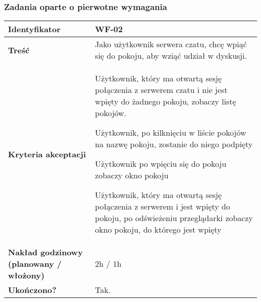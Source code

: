 \subsubsection{Zadania oparte o pierwotne wymagania}

\begin{tabular}{ | l | l | }
	\hline
		\textbf{Identyfikator} &
		WF-02
		\\

	\hline
		\textbf{Treść} & \parbox[t]{11.5cm}{\strut
			Jako użytkownik serwera czatu, chcę wpiąć się do pokoju,
			aby wziąć udział w dyskusji.
		\strut}\\

	\hline
		\parbox[t]{4cm}{\textbf{Kryteria akceptacji}} & \parbox[t]{11.5cm}{\strut
			\begin{enumreq}
				\item Użytkownik, który ma otwartą sesję
				połączenia z serwerem czatu i nie jest wpięty
				do żadnego pokoju, zobaczy listę pokojów.
				\item Użytkownik, po kilknięciu w liście pokojów
				na nazwę pokoju, zostanie do niego podpięty
				\item Użytkownik po wpięciu się do pokoju zobaczy
				okno pokoju
				\item Użytkownik, który ma otwartą sesję
				połączenia z serwerem i jest wpięty do pokoju,
				po odświeżeniu przeglądarki zobaczy okno pokoju,
				do którego jest wpięty
			\end{enumreq}
			\strut}
		\\

    \hline
      \parbox[t]{4cm}{\textbf{Nakład godzinowy (planowany / włożony)}} &
      \parbox[t]{11.5cm}{\strut
        2h / 1h
      \strut}\\

        \hline
          \parbox[t]{4cm}{\textbf{Ukończono?}} &
          \parbox[t]{11.5cm}{\strut
            Tak.
          \strut}\\

          \hline
      \end{tabular}

\vspace{1em}

